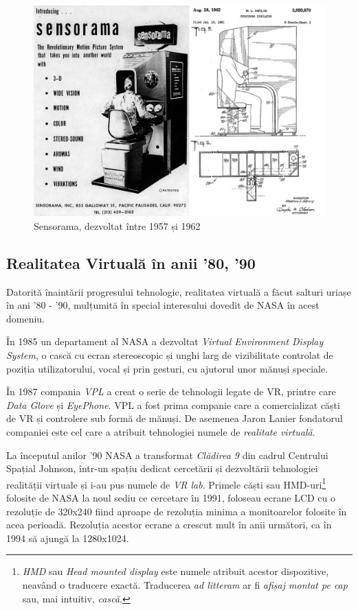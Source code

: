 \begin{figure}[h]
  \centering
  \includegraphics[scale=0.35]{img/sensorama.jpg}
  \caption{Sensorama, dezvoltat între 1957 și 1962}
\end{figure}

\subsection{Realitatea Virtuală în anii '80, '90}

Datorită înaintării progresului tehnologic, realitatea virtuală a făcut salturi uriașe în ani '80 - '90, mulțumită în special interesului dovedit de NASA în acest domeniu.

În 1985 un departament al NASA a dezvoltat \textit{Virtual Environment Display System}, o cască cu ecran stereoscopic și unghi larg de vizibilitate controlat de poziția utilizatorului, vocal și prin gesturi, cu ajutorul unor mănuși speciale.

În 1987 compania \textit{VPL} a creat o serie de tehnologii legate de VR, printre care \textit{Data Glove} și \textit{EyePhone}. VPL a fost prima companie care a comercializat căști de VR și controlere sub formă de mănuși. De asemenea Jaron Lanier fondatorul companiei este cel care a atribuit tehnologiei numele de \textit{realitate virtuală}.

La începutul anilor '90 NASA a transformat \textit{Clădirea 9} din cadrul Centrului Spațial Johnson, într-un spațiu dedicat cercetării și dezvoltării tehnologiei realității virtuale și i-au pus numele de \textit{VR lab}.
Primele căști sau HMD-uri\footnote{\textit{HMD} sau \textit{Head mounted display} este numele atribuit acestor dispozitive, neavând o traducere exactă. Traducerea \textit{ad litteram} ar fi \textit{afișaj montat pe cap} sau, mai intuitiv, \textit{cască}.} folosite de NASA la noul sediu ce cercetare în 1991, foloseau ecrane LCD cu o rezoluție de 320x240 fiind aproape de rezoluția minima a monitoarelor folosite în acea perioadă. Rezoluția acestor ecrane a crescut mult în anii următori, ca în 1994 să ajungă la 1280x1024. 


